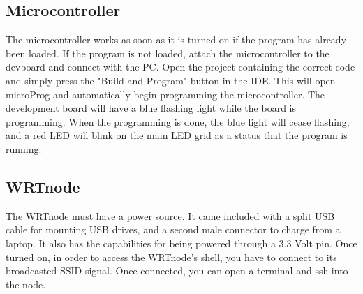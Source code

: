 \documentclass[paper=a4, fontsize=11pt]{scrartcl}
\numberwithin{equation}{section}		%
\numberwithin{figure}{section}			%
\numberwithin{table}{section}				%
\begin{document}
 \subsection{Microcontroller} 
 The microcontroller works as soon as it is turned on if the program has already been loaded. If the program is not loaded, attach the microcontroller to the devboard and connect with the PC. Open the project containing the correct code and simply press the "Build and Program" button in the IDE. This will open microProg and automatically begin programming the microcontroller. The development board will have a blue flashing light while the board is programming. When the programming is done, the blue light will cease flashing, and a red LED will blink on the main LED grid as a status that the program is running. \\
 \subsection{WRTnode}
 The WRTnode must have a power source. It came included with a split USB cable for mounting USB drives, and a second male connector to charge from a laptop. It also has the capabilities for being powered through a 3.3 Volt pin. Once turned on, in order to access the WRTnode's shell, you have to connect to its broadcasted SSID signal. Once connected, you can open a terminal and ssh into the node. \\
\end{document}
